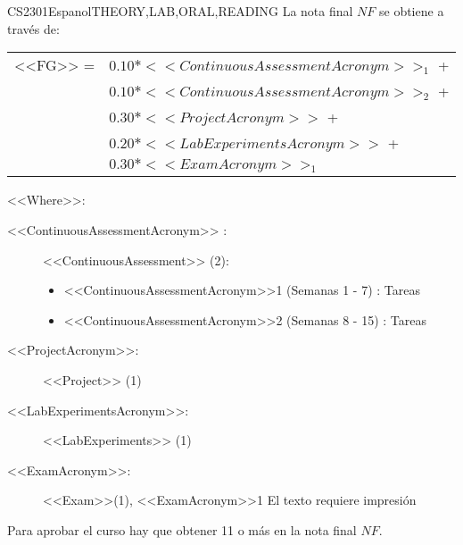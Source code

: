   \begin{evaluation}{CS2301}{Espanol}{THEORY,LAB,ORAL,READING}
  La nota final $NF$ se obtiene a través de:
 
  \begin{tabular}{cl}
   <<FG>> = & $0.10*<<ContinuousAssessmentAcronym>>_{1}$ + \\
            & $0.10*<<ContinuousAssessmentAcronym>>_{2}$ + \\
            & $0.30*<<ProjectAcronym>>$ + \\
            & $0.20*<<LabExperimentsAcronym>>$ + \\
            & $0.30*<<ExamAcronym>>_{1}$
  \end{tabular}

  \noindent <<Where>>:
  \begin{description}
   \item[<<ContinuousAssessmentAcronym>> :] <<ContinuousAssessment>> (2):
   \begin{itemize}
      \item  <<ContinuousAssessmentAcronym>>1 (Semanas 1 - 7) : Tareas
      \item <<ContinuousAssessmentAcronym>>2 (Semanas 8 - 15) : Tareas
   \end{itemize}
   \item[<<ProjectAcronym>>:] <<Project>> (1)
   \item[<<LabExperimentsAcronym>>:] <<LabExperiments>> (1)
   \item[<<ExamAcronym>>:] <<Exam>>(1), <<ExamAcronym>>1 El texto requiere impresión
   \end{description}
 
  \noindent Para aprobar el curso hay que obtener 11 o más en la nota final $NF$.
  \end{evaluation}

